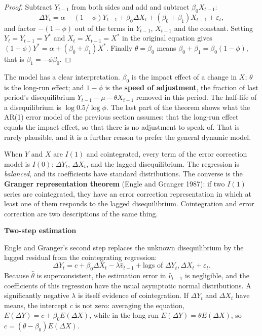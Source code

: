 \documentclass[11pt,a4paper]{article}
\numberwithin{equation}{section}
\theoremstyle{definition}
\newcommand{\subhead}[1]{%
  \par\medskip\noindent\textbf{#1}\par\nobreak\smallskip}
\begin{document}
\begin{proof}
Subtract $Y_{t-1}$ from both sides and add and subtract $\beta_0X_{t-1}$:
\[
\Delta Y_t = \alpha - (1 - \phi)Y_{t-1} + \beta_0\Delta X_t + (\beta_0 + \beta_1)X_{t-1} + \varepsilon_t ,
\]
and factor $-(1 - \phi)$ out of the terms in $Y_{t-1}$, $X_{t-1}$ and the constant. Setting $Y_t = Y_{t-1} = Y^*$ and $X_t = X_{t-1} = X^*$ in the original equation gives
$(1 - \phi)Y^* = \alpha + (\beta_0 + \beta_1)X^*$. Finally $\theta = \beta_0$ means $\beta_0 + \beta_1 = \beta_0(1 - \phi)$, that is $\beta_1 = -\phi\beta_0$.
\end{proof}

The model has a clear interpretation. $\beta_0$ is the impact effect of a change in $X$; $\theta$ is the long-run effect; and $1 - \phi$ is the \textbf{speed of
adjustment}, the fraction of last period's disequilibrium $Y_{t-1} - \mu - \theta X_{t-1}$ removed in this period. The half-life of a disequilibrium is
$\log 0.5/\log\phi$. The last part of the theorem shows what the AR(1) error model of the previous section assumes: that the long-run effect equals the
impact effect, so that there is no adjustment to speak of. That is rarely plausible, and it is a further reason to prefer the general dynamic
model.

When $Y$ and $X$ are $I(1)$ and cointegrated, every term of the error correction model is $I(0)$: $\Delta Y_t$, $\Delta X_t$, and the lagged disequilibrium. The regression
is \emph{balanced}, and its coefficients have standard distributions. The converse is the \textbf{Granger representation theorem} (Engle and Granger 1987):
if two $I(1)$ series are cointegrated, they have an error correction representation in which at least one of them responds to the lagged
disequilibrium. Cointegration and error correction are two descriptions of the same thing.

\subhead{Two-step estimation}
Engle and Granger's second step replaces the unknown disequilibrium by the lagged residual from the cointegrating regression:
\[
\Delta Y_t = c + \beta_0\Delta X_t - \lambda\hat v_{t-1} + \text{lags of }\Delta Y_t, \Delta X_t + \varepsilon_t .
\]
Because $\hat\theta$ is superconsistent, the estimation error in $\hat v_{t-1}$ is negligible, and the coefficients of this regression have the usual asymptotic normal
distributions. A significantly negative $\lambda$ is itself evidence of cointegration. If $\Delta Y_t$ and $\Delta X_t$ have means, the intercept $c$ is not zero: averaging the
equation, $E(\Delta Y) = c + \beta_0E(\Delta X)$, while in the long run $E(\Delta Y) = \theta E(\Delta X)$, so $c = (\theta - \beta_0)E(\Delta X)$.
\end{document}
